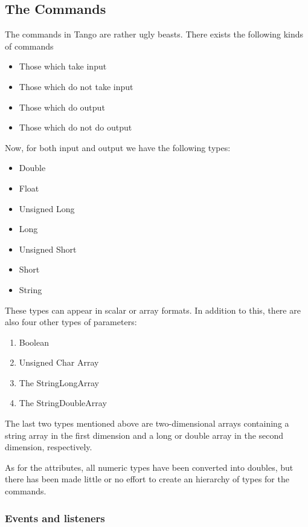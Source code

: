 \subsection{The Commands}

The commands in Tango are rather ugly beasts. There
exists the following kinds of commands
\begin{itemize}
\item Those which take input 
\item Those which do not take input 
\item Those which do output 
\item Those which do not do output 
\end{itemize}
Now, for both input and output we have the following types:
\begin{itemize}
\item Double 
\item Float
\item Unsigned Long
\item Long 
\item Unsigned Short
\item Short 
\item String
\end{itemize}
These types can appear in scalar or array formats. In addition to
this, there are also four other types of parameters:
\begin{enumerate}
\item Boolean
\item Unsigned Char Array
\item The StringLongArray 
\item The StringDoubleArray 
\end{enumerate}
The last two types mentioned above are two-dimensional arrays containing
a string array in the first dimension and a long or double array in
the second dimension, respectively.

As for the attributes, all numeric types have been converted into
doubles, but there has been made little or no effort to create an
hierarchy of types for the commands.

\subsubsection{Events and listeners}

